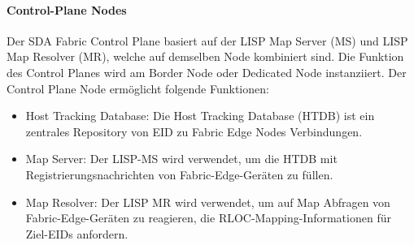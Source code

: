 \paragraph{Control-Plane Nodes}
Der SDA Fabric Control Plane basiert auf der LISP Map Server (MS) und LISP Map Resolver (MR), welche auf demselben Node kombiniert sind. Die Funktion des Control Planes wird am Border Node oder Dedicated Node instanziiert. Der Control Plane Node ermöglicht folgende Funktionen: \cite{sda-designguide}
\begin{itemize}	
	\item Host Tracking Database: Die Host Tracking Database (HTDB) ist ein zentrales Repository von EID zu Fabric Edge Nodes Verbindungen.
	\item Map Server: Der LISP-MS wird verwendet, um die HTDB mit Registrierungsnachrichten von Fabric-Edge-Geräten zu füllen.
	\item Map Resolver: Der LISP MR wird verwendet, um auf Map Abfragen von Fabric-Edge-Geräten zu reagieren, die RLOC-Mapping-Informationen für Ziel-EIDs anfordern.
\end{itemize}

